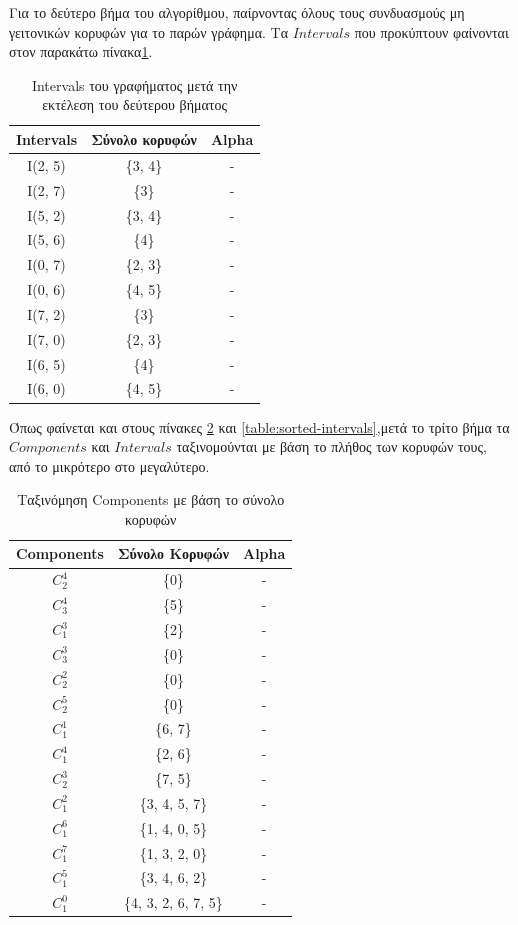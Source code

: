 Για το δεύτερο βήμα του αλγορίθμου, παίρνοντας όλους τους συνδυασμούς μη γειτονικών κορυφών για το παρών γράφημα. Τα $Intervals$ που προκύπτουν φαίνονται στον παρακάτω πίνακα\ref{table:second-step-intependent-set}. 

\begin{table}[H]
	
	\centering
	\caption{Intervals του γραφήματος μετά την εκτέλεση του δεύτερου βήματος}
	\begin{tabular}{|c|c|c|}
		\hline
		\textbf{Intervals} & \textbf{Σύνολο κορυφών} & \textbf{Alpha} \\
		\hline
		I(2, 5) & \quad \{3, 4\} & - \\
		I(2, 7) & \quad \{3\} & - \\
		I(5, 2) & \quad \{3, 4\} & - \\
		I(5, 6) & \quad \{4\} & - \\
		I(0, 7) & \quad \{2, 3\} & - \\
		I(0, 6) & \quad \{4, 5\} & - \\
		I(7, 2) & \quad \{3\} & - \\
		I(7, 0) & \quad \{2, 3\} & - \\
		I(6, 5) & \quad \{4\} & - \\
		I(6, 0) & \quad \{4, 5\} & - \\
		\hline
	\end{tabular}
\label{table:second-step-intependent-set}
\end{table}

Όπως φαίνεται και στους πίνακες \ref{table:sorted-components} και \ref{table:sorted-intervals},μετά το τρίτο βήμα τα $Components$ και $Intervals$ ταξινομούνται με βάση το πλήθος των κορυφών τους, από το μικρότερο στο μεγαλύτερο.

\begin{table}[H]
	\centering
	\caption{Ταξινόμηση Components με βάση το σύνολο κορυφών}
	\begin{tabular}{|c|c|c|}
		\hline
		\textbf{Components} & \textbf{Σύνολο Κορυφών} & \textbf{Alpha} \\
		\hline
		$C_2^4$ & \quad \{0\} & - \\
		$C_3^4$ & \quad \{5\} & - \\
		$C_1^3$ & \quad \{2\} & - \\
		$C_3^3$ & \quad \{0\} & - \\
		$C_2^2$ & \quad \{0\} & - \\
		$C_2^5$ & \quad \{0\} & - \\
		$C_1^1$ & \quad \{6, 7\} & - \\
		$C_1^4$ & \quad \{2, 6\} & - \\
		$C_2^3$ & \quad \{7, 5\} & - \\
		$C_1^2$ & \quad \{3, 4, 5, 7\} & - \\
		$C_1^6$ & \quad \{1, 4, 0, 5\} & - \\
		$C_1^7$ & \quad \{1, 3, 2, 0\} & - \\
		$C_1^5$ & \quad \{3, 4, 6, 2\} & - \\
		$C_1^0$ & \quad \{4, 3, 2, 6, 7, 5\} & - \\
		\hline
	\end{tabular}
	\label{table:sorted-components}
\end{table} 

